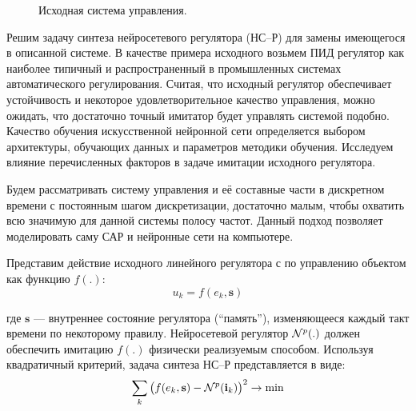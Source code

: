 \begin{figure}[h]
  \centering
  
  \caption{Исходная система управления.}
  \label{fig:ctrlloop}
\end{figure}

Решим задачу синтеза нейросетевого регулятора (НС--Р) для замены
имеющегося в описанной системе.  В качестве примера исходного возьмем
ПИД регулятор как наиболее типичный и распространенный в промышленных
системах автоматического регулирования.  Считая, что исходный
регулятор обеспечивает устойчивость и некоторое удовлетворительное
качество управления, можно ожидать, что достаточно точный имитатор
будет управлять системой подобно.  Качество обучения искусственной
нейронной сети определяется выбором архитектуры, обучающих данных и
параметров методики обучения.  Исследуем влияние перечисленных
факторов в задаче имитации исходного регулятора.

Будем рассматривать систему управления и её составные части в
дискретном времени с постоянным шагом дискретизации, достаточно малым,
чтобы охватить всю значимую для данной системы полосу частот.  Данный
подход позволяет моделировать саму САР и нейронные сети на компьютере.



Представим действие исходного линейного регулятора с
 по управлению объектом как функцию $f(.)$:
\begin{equation}\label{eq:raw_controller}
  u_k=f(e_k,\mathbf{s})
\end{equation}

\noindent где $\mathbf{s}$ --- внутреннее состояние регулятора
(``память''), изменяющееся каждый такт времени по некоторому правилу.
Нейросетевой регулятор $\mathcal{N}^p(.)$ должен обеспечить имитацию $f(.)$
физически реализуемым способом.  Используя квадратичный критерий,
задача синтеза НС--Р представляется в виде:
\begin{equation}\label{eq:nnp_synthesis_task}
  \sum\limits_k\big(f(e_k,\mathbf{s})-\NN^p(\mathbf{i}_k)\big)^2\rightarrow\min
\end{equation}

